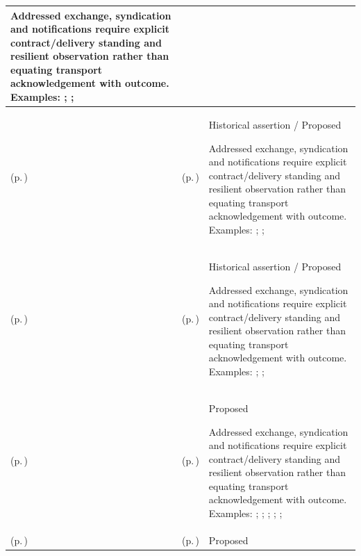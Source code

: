 \begin{longtable}{|>{\raggedright\arraybackslash}p{0.27\TableWidth}|>{\raggedright\arraybackslash}p{0.27\TableWidth}|>{\raggedright\arraybackslash}p{0.46\TableWidth}|}
Addressed exchange, syndication and notifications require explicit contract/delivery standing and resilient observation rather than equating transport acknowledgement with outcome. Examples: \nameref{feature:feat-ise-10}; \nameref{function:mediate-standards-based-health-information-communication}; \nameref{service:standards-communication-gateway-service}\\\hline
\nameref{cap:bec-health-information-communication} (p.\,\pageref{cap:bec-health-information-communication}) & \nameref{cap:ec-09} (p.\,\pageref{cap:ec-09}) & Historical assertion / Proposed

Addressed exchange, syndication and notifications require explicit contract/delivery standing and resilient observation rather than equating transport acknowledgement with outcome. Examples: \nameref{feature:feat-ise-10}; \nameref{function:mediate-standards-based-health-information-communication}; \nameref{service:standards-communication-gateway-service}\\\hline
\nameref{cap:bec-health-information-communication} (p.\,\pageref{cap:bec-health-information-communication}) & \nameref{cap:ec-12} (p.\,\pageref{cap:ec-12}) & Historical assertion / Proposed

Addressed exchange, syndication and notifications require explicit contract/delivery standing and resilient observation rather than equating transport acknowledgement with outcome. Examples: \nameref{feature:feat-ise-10}; \nameref{function:mediate-standards-based-health-information-communication}; \nameref{service:standards-communication-gateway-service}\\\hline
\nameref{cap:bec-clinical-communication-administration} (p.\,\pageref{cap:bec-clinical-communication-administration}) & \nameref{cap:ec-08} (p.\,\pageref{cap:ec-08}) & Proposed

Addressed exchange, syndication and notifications require explicit contract/delivery standing and resilient observation rather than equating transport acknowledgement with outcome. Examples: \nameref{feature:feat-sa-27}; \nameref{feature:feat-sa-28}; \nameref{feature:feat-sa-29}; \nameref{function:distribute-clinical-communication}; \nameref{service:secure-clinical-message-dispatch}; \nameref{function:track-business-delivery-acknowledgement}\\\hline
\nameref{cap:bec-clinical-communication-administration} (p.\,\pageref{cap:bec-clinical-communication-administration}) & \nameref{cap:ec-09} (p.\,\pageref{cap:ec-09}) & Proposed


\end{longtable}

